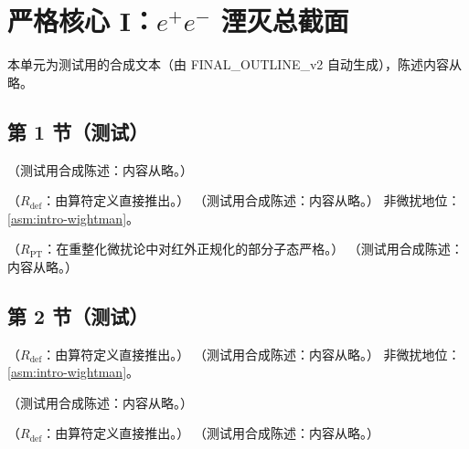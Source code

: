 \chapter{严格核心 I：$e^+e^-$ 湮灭总截面}\label{ch:ee}
本单元为测试用的合成文本（由 FINAL\_OUTLINE\_v2 自动生成），陈述内容从略。

\section{第 1 节（测试）}\label{sec:ee-R}

\begin{definition}[$R$ 比]\label{def:ee-R}
（测试用合成陈述：内容从略。）
\end{definition}

\begin{proposition}[$R=12\pi\,{\rm Im}\,\Pi$ \tagR]\label{prop:ee-R-ImPi}
（$R_{\mathrm{def}}$：由算符定义直接推出。）
（测试用合成陈述：内容从略。）
非微扰地位：\cref{asm:intro-wightman}。
\end{proposition}

\begin{lemma}\label{lem:ee-single-scale}
（$R_{\mathrm{PT}}$：在重整化微扰论中对红外正规化的部分子态严格。）
（测试用合成陈述：内容从略。）
\end{lemma}

\section{第 2 节（测试）}\label{sec:ee-analytic}

\begin{proposition}\label{prop:ee-analytic}
（$R_{\mathrm{def}}$：由算符定义直接推出。）
（测试用合成陈述：内容从略。）
非微扰地位：\cref{asm:intro-wightman}。
\end{proposition}

\begin{definition}[Adler 函数]\label{def:ee-adler}
（测试用合成陈述：内容从略。）
\end{definition}

\begin{proposition}\label{prop:ee-adler-dispersion}
（$R_{\mathrm{def}}$：由算符定义直接推出。）
（测试用合成陈述：内容从略。）
\end{proposition}

